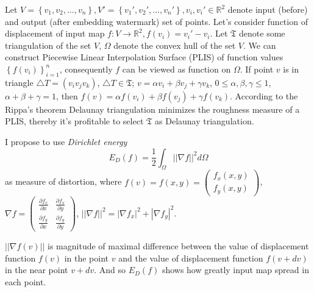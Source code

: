 \documentclass{article}
\begin{document}
Let $V = \left\{v_1, v_2, ... , v_n\right\}, V' = \left\{v_1', v_2', ... , v_n'\right\}, v_i, v_i' \in \mathbb{R}^2$ denote input (before) and output (after embedding watermark) set of points. 
Let's consider function of displacement of input map $f: V \to \mathbb{R}^2, f(v_i) = v_i' - v_i$. Let $\mathfrak{T}$ denote some triangulation of the set $V$, $\Omega$ denote the convex hull of the set $V$. 
We can construct Piecewise Linear Interpolation Surface (PLIS) of function values $\left\{f(v_i)\right\}_{i=1}^n$, consequently $f$ can be viewed as function on $\Omega$. 
If point $v$ is in triangle $\triangle T = (v_i v_j v_k)$, $\triangle T \in \mathfrak{T}$; $v = \alpha v_i + \beta v_j + \gamma v_k$, $0 \le \alpha, \beta, \gamma \le 1$, $\alpha + \beta + \gamma = 1$, then
$f(v) = \alpha f(v_i) + \beta f(v_j) + \gamma f(v_k)$. According to the Rippa's theorem Delaunay triangulation minimizes the roughness measure of a PLIS, thereby it's profitable to select $\mathfrak{T}$ as 
Delaunay triangulation.

I propose to use \textit{Dirichlet energy} $$E_D(f) = \frac{1}{2} \int_{\Omega}{||\nabla f||^2}d\Omega$$ as measure of distortion, where $f(v) = f(x, y) = \begin{pmatrix} f_x(x, y) \\ f_y(x, y) \end{pmatrix}$, 
$\nabla f = \begin{pmatrix} \frac{\partial f_x}{\partial x} & \frac{\partial f_x}{\partial y} \\ \frac{\partial f_y}{\partial x} & \frac{\partial f_y}{\partial y} \end{pmatrix}$, 
$||\nabla f||^2 = |\nabla f_x|^2 + |\nabla f_y|^2$. 

$||\nabla f(v)||$ is magnitude of maximal difference between the value 
of displacement function $f(v)$ in the point $v$ and the value of displacement function $f(v + dv)$ in the near point $v + dv$. And so $E_D(f)$ shows how greatly input map spread in each point. 
\end{document}

